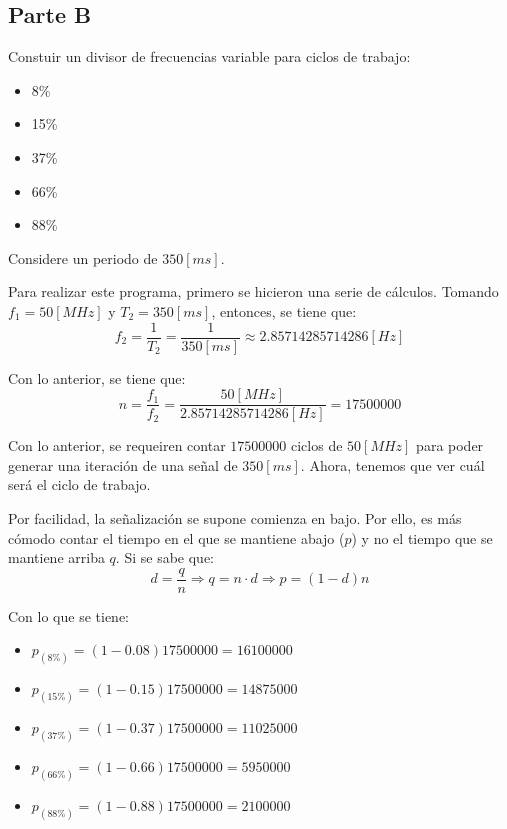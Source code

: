 \documentclass[../procedimientos.tex]{subfiles}
\begin{document}
\clearpage
\subsection{Parte B}
\begin{em}
  Constuir un divisor de frecuencias variable para ciclos de trabajo:
  \begin{itemize}
      \item 8\%
      \item 15\%
      \item 37\%
      \item 66\%
      \item 88\%
  \end{itemize}

  Considere un periodo de $350 [ms]$.
\end{em}

Para realizar este programa, primero se hicieron una serie de cálculos.  
Tomando $f_1 = 50 [MHz]$ y $T_2 = 350 [ms]$, entonces, se tiene que:
\[ f_2 = \frac{1}{T_2} = \frac{1}{350 [ms]} \approx 2.85714285714286 [Hz]\]

Con lo anterior, se tiene que:
\[ n = \frac{f_1}{f_2} = \frac{50 [MHz]}{2.85714285714286 [Hz]} = 17500000 \]

Con lo anterior, se requeiren contar $17500000$ ciclos de $50 [MHz]$ para 
poder generar una iteración de una señal de $350 [ms]$. Ahora, tenemos que ver 
cuál será el ciclo de trabajo.

Por facilidad, la señalización se supone comienza en bajo. Por ello, es más 
cómodo contar el tiempo en el que se mantiene abajo ($p$) y no el tiempo que 
se mantiene arriba $q$.  Si se sabe que:
\[ d = \frac{q}{n} \Rightarrow q = n \cdot d \Rightarrow p = (1 - d) n\]

Con lo que se tiene:
\begin{itemize}
  \item $p_{(8\%)}  = (1 - 0.08) 17500000 = 16100000$
  \item $p_{(15\%)} = (1 - 0.15) 17500000 = 14875000$
  \item $p_{(37\%)} = (1 - 0.37) 17500000 = 11025000$
  \item $p_{(66\%)} = (1 - 0.66) 17500000 =  5950000$
  \item $p_{(88\%)} = (1 - 0.88) 17500000 =  2100000$
\end{itemize}
\end{document}
